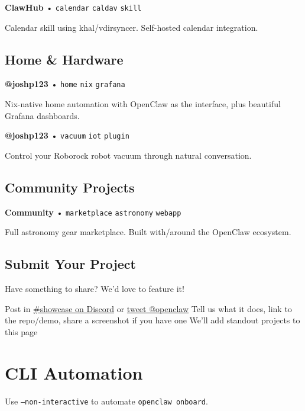 \textbf{ClawHub} • \texttt{calendar} \texttt{caldav} \texttt{skill}

Calendar skill using khal/vdirsyncer. Self-hosted calendar integration.


\subsection{Home \& Hardware}



\textbf{@joshp123} • \texttt{home} \texttt{nix} \texttt{grafana}

Nix-native home automation with OpenClaw as the interface, plus beautiful Grafana dashboards.


\textbf{@joshp123} • \texttt{vacuum} \texttt{iot} \texttt{plugin}

Control your Roborock robot vacuum through natural conversation.



\subsection{Community Projects}



\textbf{Community} • \texttt{marketplace} \texttt{astronomy} \texttt{webapp}

Full astronomy gear marketplace. Built with/around the OpenClaw ecosystem.


\hrulefill


\subsection{Submit Your Project}


Have something to share? We'd love to feature it!

Post in \href{https://discord.gg/clawd}{\#showcase on Discord} or \href{https://x.com/openclaw}{tweet @openclaw}
Tell us what it does, link to the repo/demo, share a screenshot if you have one
We'll add standout projects to this page


\clearpage

\section{CLI Automation}


Use \texttt{--non-interactive} to automate \texttt{openclaw onboard}.

